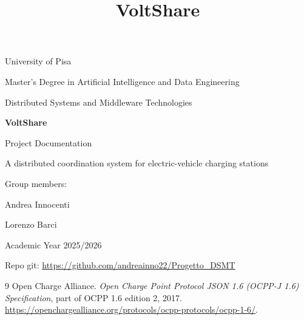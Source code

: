 \documentclass[11pt,a4paper]{article}
\title{VoltShare}
\author{}
\date{}
\begin{document}
\begin{titlepage}
\centering
{\large University of Pisa\par}
{\large Master's Degree in Artificial Intelligence and Data Engineering\par}
{\large Distributed Systems and Middleware Technologies\par}
\vspace{3.5cm}
{\Huge\bfseries VoltShare\par}
\vspace{0.6cm}
{\Large Project Documentation\par}
\vspace{0.4cm}
{\large A distributed coordination system for electric-vehicle charging stations\par}
\vfill
{\large Group members:\par}
\vspace{0.2cm}
{\large Andrea Innocenti \par Lorenzo Barci \par}
\vspace{1.2cm}
{\large Academic Year 2025/2026\par}
\end{titlepage}

\setcounter{tocdepth}{2}   %
\begingroup\footnotesize\setlength{\parskip}{0pt}\tableofcontents\endgroup
\newpage












\newpage
{}
Repo git: \url{https://github.com/andreainno22/Progetto_DSMT}
\begin{thebibliography}{9}
Open Charge Alliance.
\emph{Open Charge Point Protocol JSON 1.6 (OCPP-J 1.6) Specification}, part of
OCPP 1.6 edition 2, 2017.
\url{https://openchargealliance.org/protocols/ocpp-protocols/ocpp-1-6/}.

\end{thebibliography}
\end{document}
